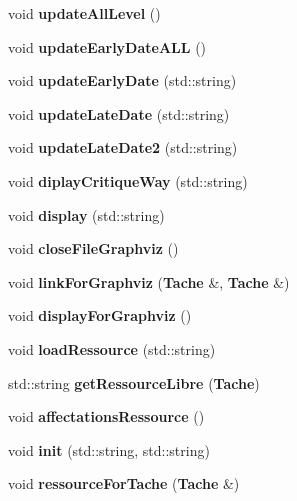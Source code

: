 \begin{DoxyCompactItemize}
\item 
void {\bfseries update\-All\-Level} ()\label{class_diagramme_a95478305e2cfaf830cd19a0b206f4957}

\item 
void {\bfseries update\-Early\-Date\-A\-L\-L} ()\label{class_diagramme_a6364bc04efa687e40ff99b827ceba9c7}

\item 
void {\bfseries update\-Early\-Date} (std\-::string)\label{class_diagramme_aa43a5bc79bd7f91070b4b7c39a395b9c}

\item 
void {\bfseries update\-Late\-Date} (std\-::string)\label{class_diagramme_a6b7918a1aec61cf8465fac4eeec01e00}

\item 
void {\bfseries update\-Late\-Date2} (std\-::string)\label{class_diagramme_a6c6fd5f520a069938b30cbefe8d7f740}

\item 
void {\bfseries diplay\-Critique\-Way} (std\-::string)\label{class_diagramme_ae71fd18aad40e6695ccb7421164486aa}

\item 
void {\bfseries display} (std\-::string)\label{class_diagramme_a6586acf2cbd668b29983d73afb896922}

\item 
void {\bfseries close\-File\-Graphviz} ()\label{class_diagramme_ab3699b38f08275f6f74cdad55b93e6fe}

\item 
void {\bfseries link\-For\-Graphviz} ({\bf Tache} \&, {\bf Tache} \&)\label{class_diagramme_a5db905aa8484d85e9f1e73baaf32f919}

\item 
void {\bfseries display\-For\-Graphviz} ()\label{class_diagramme_a39db56fd82cebc6981c6b73f16fb19e2}

\item 
void {\bfseries load\-Ressource} (std\-::string)\label{class_diagramme_acf8ddd6c1b1ce252969fe71412c6e431}

\item 
std\-::string {\bfseries get\-Ressource\-Libre} ({\bf Tache})\label{class_diagramme_adbefdecae990e4c765555df7f1a13874}

\item 
void {\bfseries affectations\-Ressource} ()\label{class_diagramme_ac7bf867efb0e0b611b6a41c3e7b0d904}

\item 
void {\bfseries init} (std\-::string, std\-::string)\label{class_diagramme_afbd0ffef66b60b5cd40d108a5abf69c8}

\item 
void {\bfseries ressource\-For\-Tache} ({\bf Tache} \&)\label{class_diagramme_a082125373aec4ee4105aa7025859fdd4}

\end{DoxyCompactItemize}
